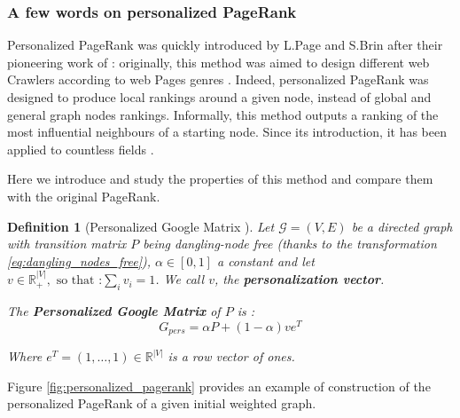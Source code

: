 \documentclass[sn-mathphys]{sn-jnl}%
\theoremstyle{thmstyleone}%
\theoremstyle{thmstyletwo}%
\theoremstyle{thmstylethree}%
\newtheorem{definition}[theo]{Definition}
\begin{document}
\subsubsection{A few words on personalized
  PageRank} \label{subsec:preferential_pagerank} Personalized PageRank
was quickly introduced by L.Page and S.Brin after their pioneering
work of \cite{brin_page_1998}: originally, this method was aimed to
design different web Crawlers according to web Pages genres
\cite{haveliwala_2003}. Indeed, personalized PageRank was designed to
produce local rankings around a given node, instead of global and
general graph nodes rankings. Informally, this method outputs a
ranking of the most influential neighbours of a starting node.  Since
its introduction, it has been applied to countless fields
\cite{gleich_2015}.

Here we introduce and study the properties of this method and compare
them with the original PageRank.

\begin{definition}[Personalized Google Matrix \cite{gleich_2015}]
  Let $\mathcal{G}=(V,E)$ be a directed graph with transition matrix
  $P$ being dangling-node free (thanks to the transformation
  \ref{eq:dangling_nodes_free}), $\alpha \in [0,1]$ a constant and let
  $v \in \mathbb{R}_{+}^{|V|}, \mbox{ so that :} \sum_{i} v_i = 1$. We
  call $v$, the \textbf{personalization vector}.

The \textbf{Personalized Google Matrix} of $P$ is :
\begin{equation}
    G_{pers} = \alpha P + (1-\alpha) ve^T
\end{equation}

Where $e^T=(1, \hdots, 1) \in \mathbb{R}^{|V|}$ is a row vector of ones. 

\end{definition}

Figure \ref{fig:personalized_pagerank} provides an example of
construction of the personalized PageRank of a given initial weighted
graph.
\end{document}
